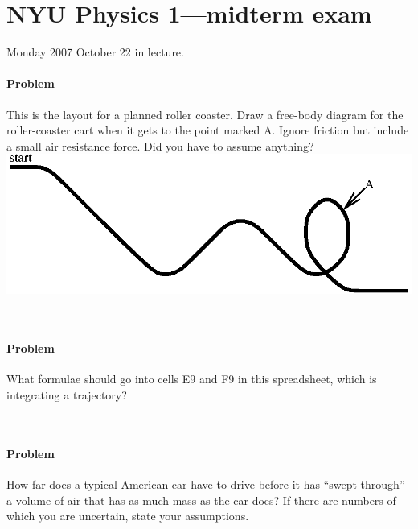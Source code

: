 \documentclass[12pt]{article}
\newcounter{problem}
\begin{document}
\section*{NYU Physics 1---midterm exam}

Monday 2007 October 22 in lecture.

\paragraph{Problem~\theproblem}%
This is the layout for a planned roller coaster.  Draw a free-body
diagram for the roller-coaster cart when it gets to the point marked
A.  Ignore friction but include a small air resistance force.  Did you
have to assume anything?\\
\includegraphics{../eps/roller_coaster.eps}

~ \vfill ~

\paragraph{Problem~\theproblem}%
What formulae should go into cells E9 and F9 in this spreadsheet,
which is integrating a trajectory?\\

~ \vfill ~

\clearpage

\paragraph{Problem~\theproblem}%
How far does a typical American car have to drive before it has
``swept through'' a volume of air that has as much mass as the car
does?  If there are numbers of which you are uncertain, state your
assumptions.
\end{document}
